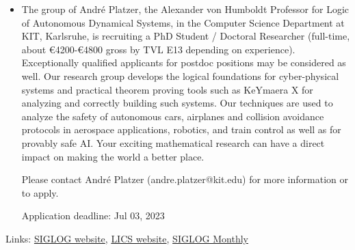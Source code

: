 \documentclass[prodmode,acmtecs]{acmsmall} %
\begin{document}
\begin{itemize}\item   The group of André Platzer, the Alexander von Humboldt Professor for Logic of Autonomous Dynamical Systems, in the Computer Science Department at KIT, Karlsruhe, is recruiting a PhD Student / Doctoral Researcher (full-time, about €4200-€4800 gross by TVL E13 depending on experience). Exceptionally qualified applicants for postdoc positions may be considered as well. Our research group develops the logical foundations for cyber-physical systems and practical theorem proving tools such as KeYmaera X for analyzing and correctly building such systems. Our techniques are used to analyze the safety of autonomous cars, airplanes and collision avoidance protocols in aerospace applications, robotics, and train control as well as for provably safe AI. Your exciting mathematical research can have a direct impact on making the world a better place. 
 
  Please contact André Platzer (andre.platzer@kit.edu) for more information or to apply. 
 
Application deadline: Jul 03, 2023 
 
\end{itemize}


\bigskip Links: \href{http://siglog.org/}{SIGLOG website}, \href{https://lics.siglog.org}{LICS website}, \href{https://lics.siglog.org/newsletters/}{SIGLOG Monthly}
\end{document}
